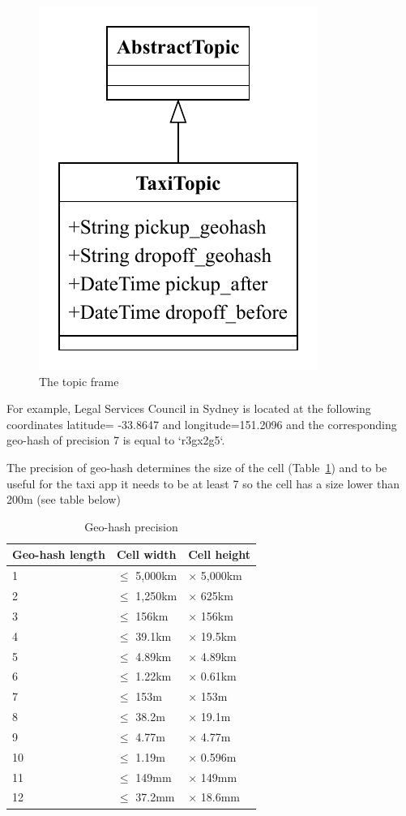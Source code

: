 \documentclass{article}
\begin{document}
\begin{figure}
	\centering
	\includegraphics[scale=0.7]{Topic.pdf}
	\caption{The topic frame}
	\label{fig:fr:topic}
\end{figure}


For example, Legal Services Council in Sydney is located at the following coordinates latitude= -33.8647 and longitude=151.2096 and the corresponding geo-hash of precision 7 is equal to `r3gx2g5`.

The precision of geo-hash determines the size of the cell (Table~\ref{tab:geoprec}) and to be useful for the taxi app it needs to be at least 7 so the cell has a size lower than 200m (see table below)

\begin{table}
	\centering
	\begin{tabular}{lll}
		\toprule
		Geo-hash length & Cell width & Cell height \\
		\midrule
		1  & $\le$ 5,000km & $\times$ 5,000km \\
		2  & $\le$ 1,250km & $\times$ 625km   \\
		3  & $\le$ 156km   & $\times$ 156km   \\
		4  & $\le$ 39.1km  & $\times$ 19.5km  \\
		5  & $\le$ 4.89km  & $\times$ 4.89km  \\
		6  & $\le$ 1.22km  & $\times$ 0.61km  \\
		7  & $\le$ 153m    & $\times$ 153m    \\
		8  & $\le$ 38.2m   & $\times$ 19.1m   \\
		9  & $\le$ 4.77m   & $\times$ 4.77m   \\
		10 & $\le$ 1.19m   & $\times$ 0.596m  \\
		11 & $\le$ 149mm   & $\times$ 149mm   \\
		12 & $\le$ 37.2mm  & $\times$ 18.6mm  \\
		\bottomrule
	\end{tabular}
	\caption{Geo-hash precision}
	\label{tab:geoprec}
\end{table}
\end{document}
